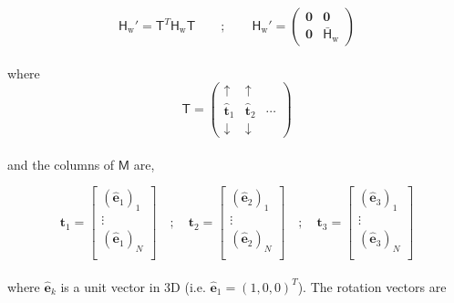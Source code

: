 \documentclass[10pt]{article}
\begin{document}
\begin{equation}
	\mathsf{H}_\text{w}' = \mathsf{T}^T \mathsf{H}_\text{w} \mathsf{T} \qquad ; \qquad \mathsf{H}_\text{w}' = \begin{pmatrix}
		\boldsymbol{0} & \boldsymbol{0} \\
		\boldsymbol{0} & \bar{\mathsf{H}}_\text{w}
	\end{pmatrix}
\end{equation}
\\
where 
\begin{equation}
	\mathsf{T} = \begin{pmatrix}
		\uparrow & \uparrow  & \\
		\hat{\boldsymbol{t}}_1 & \hat{\boldsymbol{t}}_2 & \cdots \\
		\downarrow & \downarrow & 
	\end{pmatrix}
\end{equation}
\\
and the columns of $\mathsf{M}$ are,

\begin{equation}
	\boldsymbol{t}_1 = \begin{bmatrix}
		(\hat{\boldsymbol{e}}_1)_1 \\
		\vdots \\
		(\hat{\boldsymbol{e}}_1)_N \\
	\end{bmatrix}
	\quad ; \quad 
	\boldsymbol{t}_2 = \begin{bmatrix}
		(\hat{\boldsymbol{e}}_2)_1 \\
		\vdots \\
		(\hat{\boldsymbol{e}}_2)_N \\
	\end{bmatrix}
	\quad ; \quad 
	\boldsymbol{t}_3 = \begin{bmatrix}
		(\hat{\boldsymbol{e}}_3)_1 \\
		\vdots \\
		(\hat{\boldsymbol{e}}_3)_N \\
	\end{bmatrix}
\end{equation}
\\
where $\hat{\boldsymbol{e}}_k$ is a unit vector in 3D (i.e. $\hat{\boldsymbol{e}}_1 = (1, 0, 0)^T$). The rotation vectors are
\end{document}
